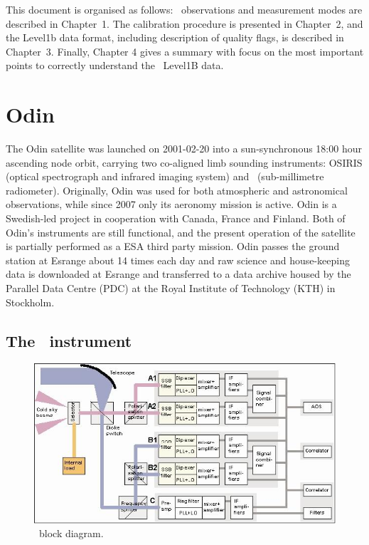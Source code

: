 This document is organised as follows:
\smr\ observations and measurement modes are described 
in Chapter~1. The calibration procedure is presented in
Chapter~2, and the Level1b data format, including description
of quality flags, is described in Chapter~3.
Finally,
Chapter 4 gives a summary with focus on the most important points to correctly
understand the \smr\ Level1B data. 
   

\section{Odin}

The Odin satellite was launched on 2001-02-20 into a sun-synchronous
18:00 hour ascending node orbit, carrying two co-aligned limb sounding
instruments: OSIRIS (optical spectrograph and infrared imaging system) and
\SMR\ (sub-millimetre radiometer). Originally, Odin was used for both
atmospheric and astronomical observations, while since 2007 only its aeronomy
mission is active. Odin is a Swedish-led project in cooperation with Canada,
France and Finland. Both of Odin's instruments are still functional, and the
present operation of the satellite is partially performed as a ESA third party
mission.
Odin passes the ground station at Esrange about 14 times each day
and raw science and house-keeping data is downloaded at
Esrange and transferred to a data archive housed by the Parallel
Data Centre (PDC) at the Royal Institute of Technology (KTH)
in Stockholm.


\subsection{The \SMR\ instrument}

\begin{figure}[t]
\includegraphics[width=14cm]{Odin_Auto2.jpg}
\caption{\smr\ block diagram.}
\label{fig:blockdiagram}
\end{figure}



